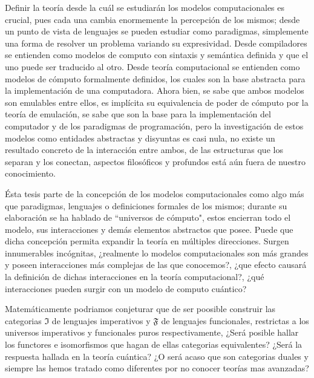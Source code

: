 \begin{conclusiones}
	Definir la teoría desde la cuál se estudiarán los modelos computacionales es crucial, pues cada una cambia enormemente la percepción de los mismos; desde un punto de vista de lenguajes se pueden estudiar como paradigmas, simplemente una forma de resolver un problema variando su expresividad. Desde compiladores se entienden como modelos de computo con sintaxis y semántica definida y que el uno puede ser traducido al otro. Desde teoría computacional se entienden como modelos de cómputo formalmente definidos, los cuales son la base abstracta para la implementación de una computadora. Ahora bien, se sabe que ambos modelos son emulables entre ellos, es implícita su equivalencia de poder de cómputo por la teoría de emulación, se sabe que son la base para la implementación del computador y de los paradigmas de programación, pero la investigación de estos modelos como entidades abstractas y disyuntas es casi nula, no existe un resultado concreto de la interacción entre ambos, de las estructuras que los separan y los conectan, aspectos filosóficos y profundos está aún fuera de nuestro conocimiento.
		
	Ésta tesis parte de la concepción de los modelos computacionales como algo más que paradigmas, lenguajes o definiciones formales de los mismos; durante su elaboración se ha hablado de ``universos de cómputo", estos encierran todo el modelo, sus interacciones y demás elementos abstractos que posee. Puede que dicha concepción permita expandir la teoría en múltiples direcciones. Surgen innumerables incógnitas, ¿realmente lo modelos computacionales son más grandes y poseen interacciones más complejas de las que conocemos?, ¿que efecto causará la definición de dichas interacciones en la teoría computacional?, ¿qué interacciones pueden surgir con un modelo de computo cuántico?
	
	Matemáticamente podriamos conjeturar que de ser poosible construir las categorias 
	$\mathfrak{I}$ de lenguajes imperativos y $\mathfrak{F}$ de lenguajes funcionales, restrictas 
	a los universos imperativos y funcionales puros respectivamente, ¿Será posible hallar los 	
	functores e isomorfismos que hagan de ellas categorias equivalentes? ¿Será la respuesta hallada 
	en la teoría cuántica? ¿O será acaso que son categorias duales y siempre las hemos tratado
	como diferentes por no conocer teorías mas avanzadas?
\end{conclusiones}

